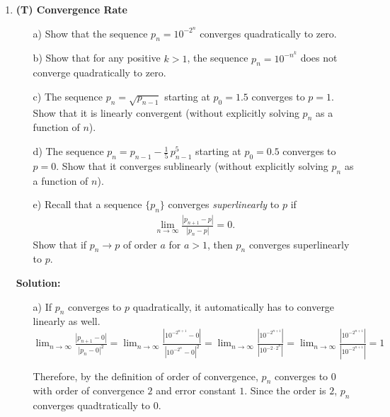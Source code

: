 \documentclass[12pt]{article}
\begin{document}
\begin{enumerate}[label=\bfseries Problem \arabic*:]
\begin{figure}[H]
\end{figure}

\newpage

\item \textbf{(T) Convergence Rate}
\begin{itemize} 
 
 
\item[a)] Show that the sequence $p_n=10^{-2^n}$ converges quadratically to zero.



 
\item[b)] Show that for any positive $k>1$, the sequence $p_n=10^{-n^k}$ does not converge quadratically to zero.


  
\item[c)] The sequence $p_n=\sqrt{p_{n-1}}$ starting at $p_0=1.5$ converges to $p=1$. Show that it is linearly convergent (without explicitly solving $p_n$ as a function of $n$).



 
 \item[d)] The sequence $p_n=p_{n-1}-\frac{1}{5} \, p_{n-1}^5$ starting at $p_0=0.5$ converges to $p=0$. Show that it converges sublinearly (without explicitly solving $p_n$ as a function of $n$).


 

\item[e)] Recall that a sequence $\{p_n\}$ converges \textit{superlinearly} to $p$ if 
\begin{align*}
\lim_{n\rightarrow \infty} \frac{|p_{n+1}-p|}{|p_{n}-p|} = 0.
\end{align*}
Show that if $p_n \rightarrow p$ of order $a$ for $a>1$, then $p_n$ converges superlinearly to $p$.



  
\end{itemize}
\vspace{1em}
\textbf{Solution:}\par 
\begin{itemize} 

  \item[a)]If $p_n$ converges to $p$ quadratically, it automatically has to converge linearly as well.$\displaystyle{\lim_{n\rightarrow\infty}}\frac{|p_{n+1}-0|}{|p_n-0|^2}
  =\displaystyle{\lim_{n\rightarrow\infty}}\frac{|10^{-2^{n+1}}-0|}{|10^{-2^n}-0|^2}
  =\displaystyle{\lim_{n\rightarrow\infty}}\frac{|10^{-2^{n+1}}|}{|10^{-2\cdot2^n}|}
  =\displaystyle{\lim_{n\rightarrow\infty}}\frac{|10^{-2^{n+1}}|}{|10^{-2^{n+1}}|}=1$\par 
  Therefore, by the definition of order of convergence, $p_n$ converges to $0$ with order of convergence $2$ and error constant $1$. Since the order is $2$, $p_n$ converges quadtratically to $0$.
   

\end{itemize}
\end{enumerate}
\end{document}

